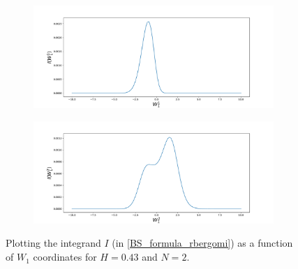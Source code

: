 \documentclass[11pt]{article}
\begin{document}
\begin{figure}[h!]
	\centering
	\begin{subfigure}{.5\textwidth}
		\centering
		\includegraphics[width=1\linewidth]{./figures/integrand_plotting_rBergomi/1D_plots/N_2/H_043/Bergomi_integrand_K_1_H_043_W11_N_2}
		\caption{}
		\label{fig:sub3}
	\end{subfigure}%
	\begin{subfigure}{.5\textwidth}
		\centering
		\includegraphics[width=1\linewidth]{./figures/integrand_plotting_rBergomi/1D_plots/N_2/H_043/Bergomi_integrand_K_1_H_043_W12_N_2}
		\caption{}
		\label{fig:sub4}
	\end{subfigure}
	\caption{Plotting the integrand $I$ (in \eqref{BS_formula_rbergomi}) as a function of $W_1$ coordinates for $H=0.43$ and $N=2$.}
	\label{fig:Integrand_H_043_N_2_W_1}
\end{figure}
\end{document}

